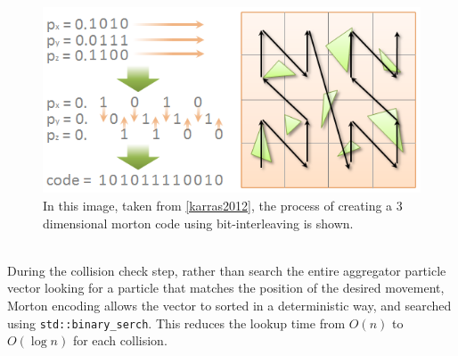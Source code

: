\documentclass[fleqn,10pt]{UserGuideArx} %
\begin{document}
\begin{figure}[!h]\centering %
    \includegraphics[width=\linewidth]{images/fig04-z-curvekarras.png}
    \caption{In this image, taken from \ref{karras2012}, the process of creating a 3 dimensional morton code using bit-interleaving is shown.}
    \label{fig:KarrasMortonGeneration}
    \end{figure}

~\\
During the collision check step, rather than search the entire aggregator particle vector looking for a particle that matches the position of the desired movement, Morton encoding allows the vector to sorted in a deterministic way, and searched using \texttt{std\allowbreak::binary\_serch}. This reduces the lookup time from $O(n)$ to $O(\log n)$ for each collision.\\
\end{document}
